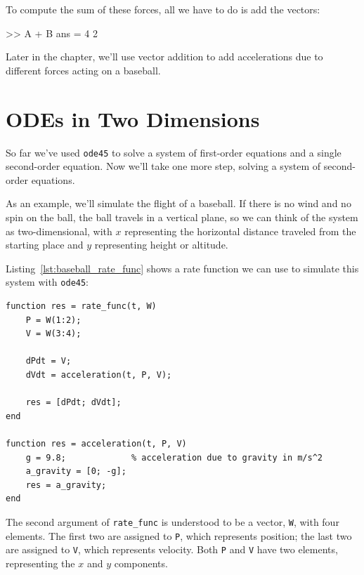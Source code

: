 To compute the sum of these forces, all we have to do is add the vectors:

\begin{code}
>> A + B
ans = 4     2
\end{code}

Later in the chapter, we'll use vector addition to add accelerations due to different forces acting on a baseball.


\section{ODEs in Two Dimensions}
\label{projectile}

So far we've used \lstinline{ode45} to solve a system of first-order equations and a single second-order equation.  Now we'll take one more step, solving a system  of second-order equations.

As an example, we'll simulate the flight of a baseball.
If there is no wind and no spin on the ball, the ball travels in a vertical plane, so we can think of the system as two-dimensional, with $x$ representing the horizontal distance
traveled from the starting place and $y$ representing height or altitude.


Listing~\ref{lst:baseball_rate_func} shows a rate function we can use to simulate this system with \lstinline{ode45}:

\begin{lstlisting}[caption={A rate function we can use to model the flight of a baseball}, label={lst:baseball_rate_func}]
function res = rate_func(t, W)
    P = W(1:2);
    V = W(3:4);

    dPdt = V;
    dVdt = acceleration(t, P, V);

    res = [dPdt; dVdt];
end

function res = acceleration(t, P, V)
    g = 9.8;             % acceleration due to gravity in m/s^2
    a_gravity = [0; -g];
    res = a_gravity;
end
\end{lstlisting}

The second argument of \lstinline{rate_func} is understood to be a vector,
\lstinline{W}, with four elements.  The first two are assigned to \lstinline{P},
which represents position; the last two are assigned to \lstinline{V}, which
represents velocity. Both \lstinline{P} and \lstinline{V} have two elements,
representing the $x$ and $y$ components.


